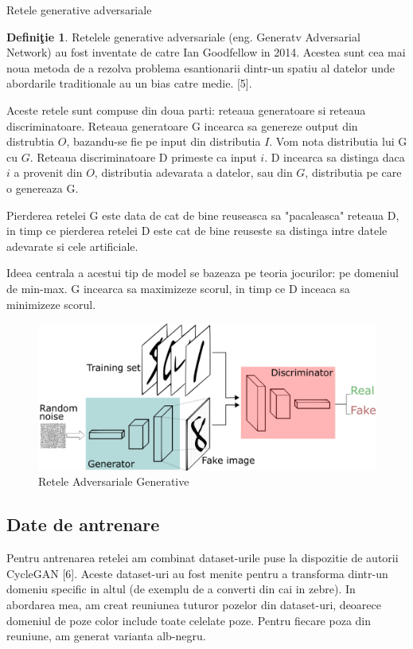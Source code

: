 \documentclass[12pt]{article}
\theoremstyle{definition}
\newtheorem{defi}[thr]{\bf Defini\c{t}ie}
\begin{document}
\begin{subsubsection}{Retele generative adversariale}
\begin{defi}
Retelele generative adversariale (eng. Generatv Adversarial Network) au fost inventate de catre Ian Goodfellow in 2014.
Acestea sunt cea mai noua metoda de a rezolva problema esantionarii dintr-un spatiu al datelor unde abordarile traditionale au un bias catre medie. [5].

Aceste retele sunt compuse din doua parti: reteaua generatoare si reteaua discriminatoare.
Reteaua generatoare G incearca sa genereze output din distrubtia $O$, bazandu-se fie pe input din distributia $I$. Vom nota distributia lui G cu $G$.
Reteaua discriminatoare D primeste ca input $i$. D incearca sa distinga daca $i$ a provenit din $O$, distributia adevarata a datelor, sau din $G$, distributia pe care o genereaza G.

Pierderea retelei G este data de cat de bine reuseasca sa "pacaleasca" reteaua D, in timp ce pierderea retelei D este cat de bine reuseste sa distinga intre datele adevarate si cele artificiale.

\end{defi}
Ideea centrala a acestui tip de model se bazeaza pe teoria jocurilor: pe domeniul de min-max. G incearca sa maximizeze scorul, in timp ce D inceaca sa minimizeze scorul.

\begin{figure}
  \centering
  \includegraphics[width=0.7\linewidth]{GAN.png}
  \caption{Retele Adversariale Generative}
  \label{fig:GAN}
\end{figure}

\end{subsubsection}

\subsection{Date de antrenare}

Pentru antrenarea retelei am combinat dataset-urile puse la dispozitie de autorii CycleGAN [6].
Aceste dataset-uri au fost menite pentru a transforma dintr-un domeniu specific in altul (de exemplu de a converti din cai in zebre).
In abordarea mea, am creat reuniunea tuturor pozelor din dataset-uri, deoarece domeniul de poze color include toate celelate poze.
Pentru fiecare poza din reuniune, am generat varianta alb-negru.
\end{document}
